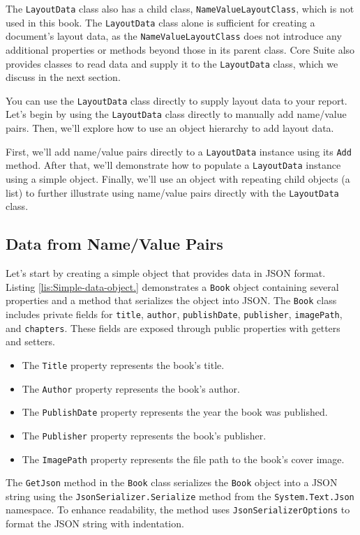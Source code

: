 \documentclass[american,letterpaper]{tufte-book}
\numberwithin{equation}{section}
\numberwithin{figure}{section}
\begin{document}
{{The \texttt{LayoutData} class also has a child class, \texttt{NameValueLayoutClass},
which is not used in this book. The \texttt{LayoutData} class alone
is sufficient for creating a document’s layout data, as the \texttt{NameValueLayoutClass}
does not introduce any additional properties or methods beyond those
in its parent class. Core Suite also provides classes to read data
and supply it to the \texttt{LayoutData} class, which we discuss in the next
section.

You can use the \texttt{LayoutData} class directly to supply layout
data to your report. Let’s begin by using the \texttt{LayoutData}
class directly to manually add name/value pairs. Then, we’ll explore
how to use an object hierarchy to add layout data.

First, we’ll add name/value pairs directly to a \texttt{LayoutData}
instance using its \texttt{Add} method. After that, we’ll demonstrate
how to populate a \texttt{LayoutData} instance using a simple object.
Finally, we’ll use an object with repeating child objects (a list)
to further illustrate using name/value pairs directly with the \texttt{LayoutData}
class.

\subsection{Data from Name/Value Pairs}

Let’s start by creating a simple object that provides data in JSON
format. Listing \ref{lis:Simple-data-object.} demonstrates a \texttt{Book}
object containing several properties and a method that serializes
the object into JSON. The \texttt{Book} class includes private fields
for \texttt{title}, \texttt{author}, \texttt{publishDate}, \texttt{publisher},
\texttt{imagePath}, and \texttt{chapters}. These fields are exposed
through public properties with getters and setters.
\begin{itemize}
\item The \texttt{Title} property represents the book’s title.
\item The \texttt{Author} property represents the book’s author.
\item The \texttt{PublishDate} property represents the year the book was
published.
\item The \texttt{Publisher} property represents the book’s publisher.
\item The \texttt{ImagePath} property represents the file path to the book’s
cover image.
\end{itemize}
The \texttt{GetJson} method in the \texttt{Book} class serializes
the \texttt{Book} object into a JSON string using the \texttt{JsonSerializer.Serialize}
method from the \texttt{System.Text.Json} namespace. To enhance readability,
the method uses \texttt{JsonSerializerOptions} to format the JSON
string with indentation.

}}
\end{document}
